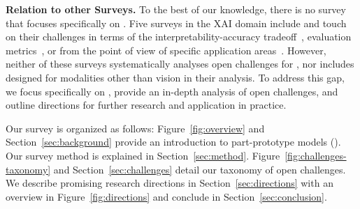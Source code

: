 


\textbf{Relation to other Surveys.} To the best of our knowledge, there is no survey that focuses specifically on \ppms. 
Five surveys in the XAI domain include \ppms and touch on their challenges in terms of the interpretability-accuracy tradeoff~\citep{Ibrahim2022_acm-csur_Explainable-CNNs}, evaluation metrics~\citep{Nauta2023_csur_evaluating-xai-survey,Nauta2023_wcxai_co-12-for-prototype-models}, or from the point of view of specific application areas~\citep{Alpherts2024_facct_perceptive-visual-urban-analytics,Patricio2024_acm-csur_XAI-medical-image-classification}.
However, neither of these surveys systematically analyses open challenges for \ppms, nor includes \ppms designed for modalities other than vision in their analysis.
To address this gap, we focus specifically on \ppms, provide an in-depth analysis of open challenges, and outline directions for further research and application in practice. 

Our survey is organized as follows: Figure~\ref{fig:overview} and Section~\ref{sec:background} provide an introduction to part-prototype models (\ppms). Our survey method is explained in Section~\ref{sec:method}. Figure~\ref{fig:challenges-taxonomy} and Section~\ref{sec:challenges} detail our taxonomy of open challenges. 
We describe promising research directions in Section~\ref{sec:directions} with an overview in Figure~\ref{fig:directions} and conclude in Section~\ref{sec:conclusion}.
